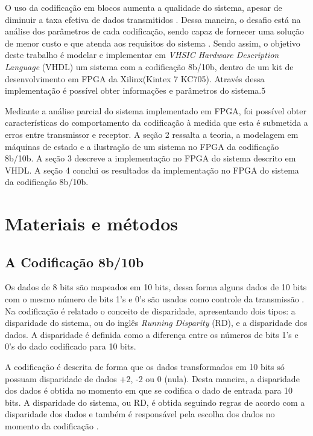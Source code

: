 \documentclass[11pt,twocolumn]{article}
\begin{document}
O uso da codificação em blocos aumenta a qualidade do sistema, apesar de diminuir a taxa efetiva de dados transmitidos \cite{Berlekamp}. Dessa maneira, o desafio está na análise dos parâmetros de cada codificação, sendo capaz de fornecer uma solução de menor custo e que atenda aos requisitos do sistema \cite{Franaszek}. Sendo assim, o objetivo deste trabalho é modelar e implementar em \textit{VHSIC Hardware Description Language} (VHDL) um sistema com a codificação 8b/10b, dentro de um kit de desenvolvimento em FPGA da Xilinx(Kintex 7 KC705). Através dessa implementação é possível obter informações e parâmetros do sistema.5

Mediante a análise parcial do sistema implementado em FPGA, foi possível obter características do comportamento da codificação à medida que esta é submetida a erros entre transmissor e receptor. A seção 2 ressalta a teoria, a modelagem em máquinas de estado e a ilustração de um sistema no FPGA da codificação 8b/10b. A seção 3 descreve a implementação no FPGA do sistema descrito em VHDL. A seção 4 conclui os resultados da implementação no FPGA do sistema da codificação 8b/10b.

\section{Materiais e métodos}

\subsection{A Codificação 8b/10b}

Os dados de 8 bits são mapeados em 10 bits, dessa forma alguns dados de 10 bits com o mesmo número de bits 1's e 0's são usados como controle da transmissão \cite{Franaszek}. Na codificação é relatado o conceito de disparidade, apresentando dois tipos: a disparidade do sistema, ou do inglês \textit{Running Disparity} (RD), e a disparidade dos dados. A disparidade é definida como a diferença entre os números de bits 1's e 0's do dado codificado para 10 bits. 

A codificação é descrita de forma que os dados transformados em 10 bits só possuam disparidade de dados +2, -2 ou 0 (nula). Desta maneira, a disparidade dos dados é obtida no momento em que se codifica o dado de entrada para 10 bits. A disparidade do sistema, ou RD, é obtida seguindo regras de acordo com a disparidade dos dados e também é responsável pela escolha dos dados no momento da codificação \cite{Franaszek}.
\end{document}
